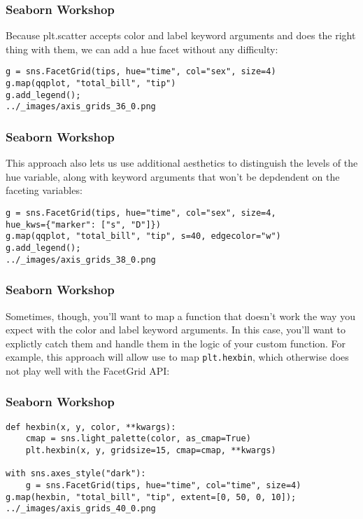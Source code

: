 \begin{frame}[fragile]
\frametitle{Seaborn Workshop}
\large
Because plt.scatter accepts color and label keyword arguments and does the right thing with them, we can add a hue facet without any difficulty:
\begin{verbatim}
g = sns.FacetGrid(tips, hue="time", col="sex", size=4)
g.map(qqplot, "total_bill", "tip")
g.add_legend();
../_images/axis_grids_36_0.png
\end{verbatim}

\end{frame}
\begin{frame}[fragile]
	\frametitle{Seaborn Workshop}
	\large
This approach also lets us use additional aesthetics to distinguish the levels of the hue variable, along with keyword arguments that won’t be depdendent on the faceting variables:
\begin{verbatim}
g = sns.FacetGrid(tips, hue="time", col="sex", size=4,
hue_kws={"marker": ["s", "D"]})
g.map(qqplot, "total_bill", "tip", s=40, edgecolor="w")
g.add_legend();
../_images/axis_grids_38_0.png
\end{verbatim}

\end{frame}
\begin{frame}[fragile]
\frametitle{Seaborn Workshop}
\large
Sometimes, though, you’ll want to map a function that doesn’t work the way you expect with the color and label keyword arguments. In this case, you’ll want to explictly catch them and handle them in the logic of your custom function. For example, this approach will allow use to map \texttt{plt.hexbin}, which otherwise does not play well with the FacetGrid API:
\end{frame}
\begin{frame}[fragile]
	\frametitle{Seaborn Workshop}
	\large
\begin{verbatim}
def hexbin(x, y, color, **kwargs):
    cmap = sns.light_palette(color, as_cmap=True)
    plt.hexbin(x, y, gridsize=15, cmap=cmap, **kwargs)

with sns.axes_style("dark"):
    g = sns.FacetGrid(tips, hue="time", col="time", size=4)
g.map(hexbin, "total_bill", "tip", extent=[0, 50, 0, 10]);
../_images/axis_grids_40_0.png
\end{verbatim}
\end{frame}
